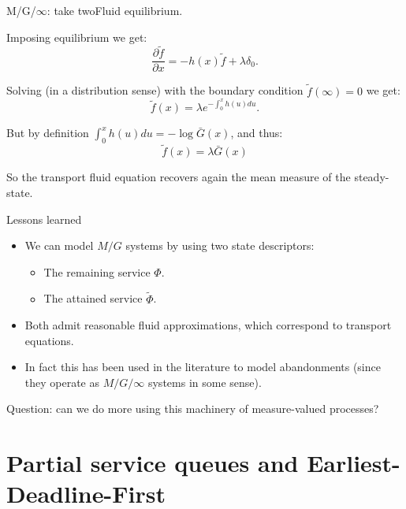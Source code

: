 \documentclass[aspectratio=169]{beamer}
\newenvironment*{myitem}[1][1.5em]{\begin{itemize}\setlength{\itemsep}{#1}}{\end{itemize}}
\begin{document}
\begin{frame}{M/G/$\infty$: take two}{Fluid equilibrium.}
	
Imposing equilibrium we get:
	\begin{equation*}
		\frac{\partial \tilde f}{\partial x} = - h(x)\tilde{f} + \lambda \delta_0.
	\end{equation*}

Solving (in a distribution sense) with the boundary condition $\tilde f (\infty) = 0$ we get:
	\begin{equation*}
		\tilde{f}(x) = \lambda e^{-\int_0^x h(u)du}.
	\end{equation*}

But by definition $\int_0^x h(u) du = -\log \bar{G}(x)$, and thus:
	\begin{equation*}
		\tilde{f}(x) = \lambda \bar{G}(x)
	\end{equation*}

So the transport fluid equation recovers again the mean measure of the steady-state.

\end{frame}

\begin{frame}{Lessons learned}

	\begin{myitem}
		\item We can model $M/G$ systems by using two state descriptors:
			\begin{itemize}
				\item The remaining service $\Phi$.
				\item The attained service $\tilde\Phi$.
			\end{itemize}
		\item Both admit reasonable fluid approximations, which correspond to transport equations.
		\item In fact this has been used in the literature to model abandonments (since they operate as $M/G/\infty$ systems in some sense).
	\end{myitem}
	\pause \vfill
	\alert{Question:} can we do more using this machinery of measure-valued processes?
\end{frame}

\section{Partial service queues and Earliest-Deadline-First}
\end{document}
